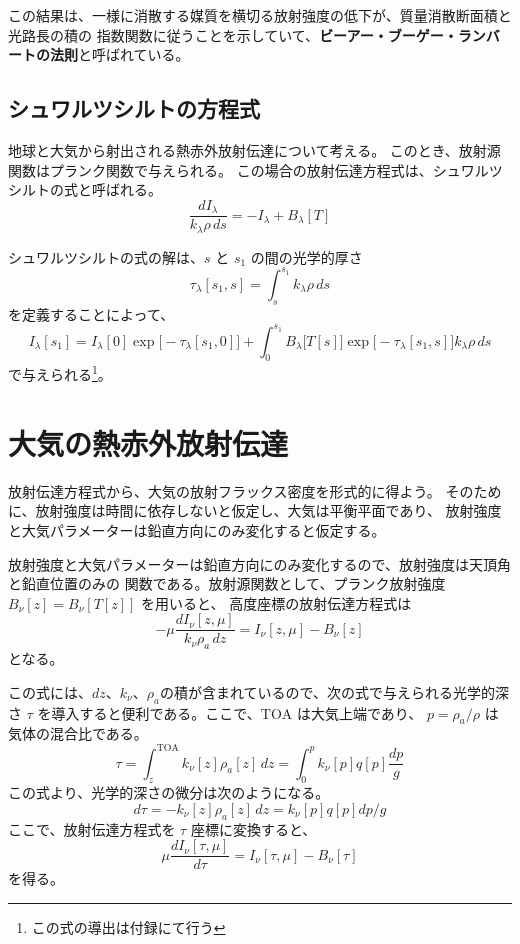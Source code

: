 \documentclass[article,twoside]{dennou777}
\newcommand{\hmemph}[1]{\textbf{#1}}
\begin{document}
この結果は、一様に消散する媒質を横切る放射強度の低下が、質量消散断面積と光路長の積の
指数関数に従うことを示していて、\hmemph{ビーアー・ブーゲー・ランバートの法則}と呼ばれている。


\subsection{シュワルツシルトの方程式}
地球と大気から射出される熱赤外放射伝達について考える。
このとき、放射源関数はプランク関数で与えられる。
この場合の放射伝達方程式は、シュワルツシルトの式と呼ばれる。
\begin{equation}
	\frac{dI_\lambda}{k_\lambda\rho\,ds}=-I_\lambda+B_\lambda[T]
\end{equation}

シュワルツシルトの式の解は、$s$ と $s_1$ の間の光学的厚さ
\begin{equation}
	\tau_\lambda[s_1,s]=\int^{s_1}_s k_\lambda\rho\,ds
\end{equation}
を定義することによって、
\begin{equation}
	I_\lambda[s_1]=I_\lambda[0]\exp\bigl[-\tau_\lambda[s_1,0]\bigr]+
	\int^{s_1}_{0}B_\lambda\bigl[T[s]\bigr]\exp\bigl[-\tau_\lambda[s_1,s]\bigr]k_\lambda\rho\,ds
\end{equation}
で与えられる\footnote{この式の導出は付録にて行う}。


\section{大気の熱赤外放射伝達}
放射伝達方程式から、大気の放射フラックス密度を形式的に得よう。
そのために、放射強度は時間に依存しないと仮定し、大気は平衡平面であり、
放射強度と大気パラメーターは鉛直方向にのみ変化すると仮定する。

放射強度と大気パラメーターは鉛直方向にのみ変化するので、放射強度は天頂角と鉛直位置のみの
関数である。放射源関数として、プランク放射強度 $B_\nu[z]=B_\nu[T[z]]$ を用いると、
高度座標の放射伝達方程式は
\begin{equation}
	-\mu\frac{dI_\nu[z,\mu]}{k_\nu\rho_a\,dz}=I_\nu[z,\mu]-B_\nu[z]
\end{equation}
となる。

この式には、$dz$、$k_\nu$、$\rho_a$の積が含まれているので、次の式で与えられる光学的深さ
$\tau$ を導入すると便利である。ここで、$\mathrm{TOA}$ は大気上端であり、
$p=\rho_a/\rho$ は気体の混合比である。
\begin{equation}
	\tau=\int^{\mathrm{TOA}}_{z} k_\nu[z]\rho_a[z]\,dz=\int^p_0 k_\nu[p]q[p]\frac{dp}{g}
\end{equation}
この式より、光学的深さの微分は次のようになる。
\begin{equation}
	d\tau=-k_\nu[z]\rho_a[z]\,dz=k_\nu[p]q[p]dp/g
\end{equation}
ここで、放射伝達方程式を $\tau$ 座標に変換すると、
\begin{equation}
	\mu\frac{dI_\nu[\tau,\mu]}{d\tau}=I_\nu[\tau,\mu]-B_\nu[\tau]
\end{equation}
を得る。
\end{document}
